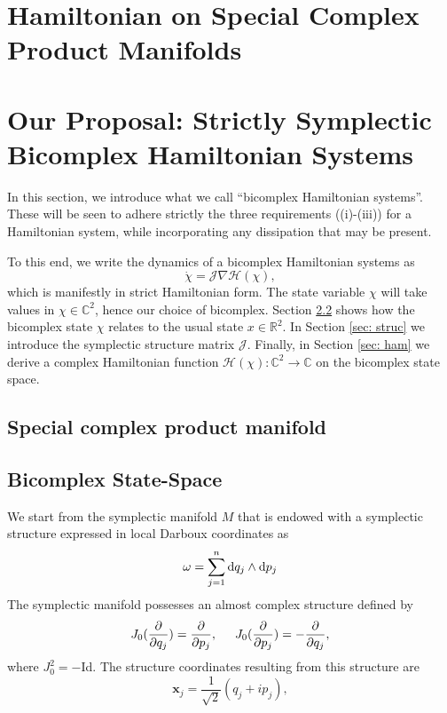 \section{Hamiltonian on Special Complex Product Manifolds}

\section{Our Proposal: Strictly Symplectic Bicomplex Hamiltonian Systems }
\label{sec: bicomplex}
In this section, we introduce what we call ``bicomplex Hamiltonian systems''.  These will be seen to adhere strictly the three requirements ((i)-(iii)) for a Hamiltonian system, while incorporating any dissipation that may be present.

To this end, we write the dynamics of a bicomplex Hamiltonian systems as
\begin{equation}
\label{eq: bicomphamdes}
    \Dot{\chi}=\mathcal{J}\nabla\mathcal{H}(\chi),
\end{equation}
which is manifestly in strict Hamiltonian form.  The state variable $\chi$ will take values in $\mathcal{\chi}\in\mathbb{C}^{2}$, hence our choice of bicomplex.  Section \ref{sec: state} shows how the bicomplex state $\chi$  relates to the usual state $x \in \mathbb{R}^{2}$. In Section \ref{sec: struc} we introduce the symplectic structure  matrix $\mathcal{J}$.  Finally, in Section \ref{sec: ham} we derive a
complex Hamiltonian function $\mathcal{H}(\chi) : \mathbb{C}^{2} \to \mathbb{C}$ on the bicomplex state space.

\subsection{Special complex product manifold}



\subsection{Bicomplex State-Space}
\label{sec: state}
We start from the symplectic manifold $M$ that is endowed with a symplectic structure expressed in local Darboux coordinates as
\begin{equation}
    \omega = \sum_{j=1}^n\dif q_j \wedge \dif p_j
\end{equation}
The symplectic manifold possesses an almost complex structure defined by \cite{}
\begin{equation}
    J_0(\pdv{}{q_j})=\pdv{}{p_j},\hspace{5mm}J_0(\pdv{}{p_j})=-\pdv{}{q_j},
\end{equation}
where $J_0^2=-$Id.
The structure coordinates resulting from this structure are
\begin{equation}
\label{eq: lad}
    \textbf{x}_j =\frac{1}{\sqrt{2}} \left(q_j+i p_j\right),
\end{equation}



